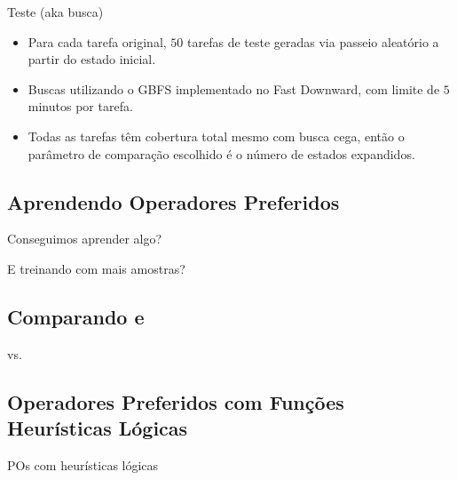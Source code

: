 \documentclass{beamer}
\begin{document}
\begin{frame}{Teste (aka busca)}
\begin{itemize}
  \item Para cada tarefa original, \alert{$50$ tarefas de teste} geradas via passeio aleatório a partir do estado inicial.
  \pause
  \item Buscas utilizando o GBFS implementado no Fast Downward, com limite de \alert{$5$ minutos} por tarefa.
  \pause
  \item Todas as tarefas têm cobertura total mesmo com busca cega, então o parâmetro de comparação escolhido é o \alert{número de estados expandidos}.
\end{itemize}
\end{frame}


\subsection{Aprendendo Operadores Preferidos}
\begin{frame}{Conseguimos aprender algo?}

\end{frame}

\begin{frame}{E treinando com mais amostras?}

\end{frame}

\subsection{Comparando \bfsrs e \bfsrw}
\begin{frame}{\bfsrs vs. \bfsrw}

\end{frame}

\subsection{Operadores Preferidos com Funções Heurísticas Lógicas}
\begin{frame}{POs com heurísticas lógicas}
  
\end{frame}
\end{document}
